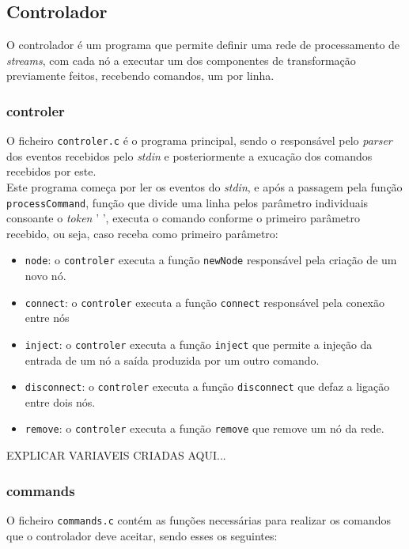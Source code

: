 \documentclass[12pt]{article}
\begin{document}
\subsection{Controlador}
O controlador é um programa que permite definir uma rede de processamento de \textit{streams}, com cada nó a executar um dos componentes de transformação previamente feitos, recebendo comandos, um por linha. 

\subsubsection{controler}
O ficheiro \texttt{controler.c} é o programa principal, sendo o responsável pelo \textit{parser} dos eventos recebidos pelo \textit{stdin} e posteriormente a exucação dos comandos recebidos por este.
\\Este programa começa por ler os eventos do \textit{stdin}, e após a passagem pela função \texttt{processCommand}, função que divide uma linha pelos parâmetro individuais consoante o \textit{token} ' ', executa o comando conforme o primeiro parâmetro recebido, ou seja, caso receba como primeiro parâmetro:
\begin{itemize}
\item \texttt{node}: o \texttt{controler} executa a função \texttt{newNode} responsável pela criação de um novo nó.
\item \texttt{connect}: o \texttt{controler} executa a função \texttt{connect} responsável pela conexão entre nós
\item \texttt{inject}: o \texttt{controler} executa a função \texttt{inject} que permite a injeção da entrada de um nó a saída produzida por um outro comando.
\item \texttt{disconnect}: o \texttt{controler} executa a função \texttt{disconnect} que defaz a ligação entre dois nós.
\item \texttt{remove}: o \texttt{controler} executa a função \texttt{remove} que remove um nó da rede.
\end{itemize}
EXPLICAR VARIAVEIS CRIADAS AQUI...

\subsubsection{commands}
O ficheiro \texttt{commands.c} contém as funções necessárias para realizar os comandos que o controlador deve aceitar, sendo esses os seguintes:
\end{document}
